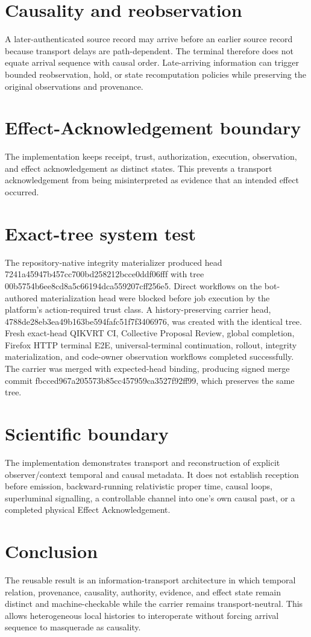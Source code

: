 \documentclass[11pt]{article}
\begin{document}
\section{Causality and reobservation}
A later-authenticated source record may arrive before an earlier source record because transport delays are path-dependent. The terminal therefore does not equate arrival sequence with causal order. Late-arriving information can trigger bounded reobservation, hold, or state recomputation policies while preserving the original observations and provenance.

\section{Effect-Acknowledgement boundary}
The implementation keeps receipt, trust, authorization, execution, observation, and effect acknowledgement as distinct states. This prevents a transport acknowledgement from being misinterpreted as evidence that an intended effect occurred.

\section{Exact-tree system test}
The repository-native integrity materializer produced head 7241a45947b457cc700bd258212bcce0ddf06fff with tree 00b5754b6ee8cd8a5c66194dca559207cff256e5. Direct workflows on the bot-authored materialization head were blocked before job execution by the platform's action-required trust class. A history-preserving carrier head, 4788de28eb3ea49b163be594fafc51f7f3406976, was created with the identical tree. Fresh exact-head QIKVRT CI, Collective Proposal Review, global completion, Firefox HTTP terminal E2E, universal-terminal continuation, rollout, integrity materialization, and code-owner observation workflows completed successfully. The carrier was merged with expected-head binding, producing signed merge commit fbcced967a205573b85cc457959ca3527f92ff99, which preserves the same tree.

\section{Scientific boundary}
The implementation demonstrates transport and reconstruction of explicit observer/context temporal and causal metadata. It does not establish reception before emission, backward-running relativistic proper time, causal loops, superluminal signalling, a controllable channel into one's own causal past, or a completed physical Effect Acknowledgement.

\section{Conclusion}
The reusable result is an information-transport architecture in which temporal relation, provenance, causality, authority, evidence, and effect state remain distinct and machine-checkable while the carrier remains transport-neutral. This allows heterogeneous local histories to interoperate without forcing arrival sequence to masquerade as causality.
\end{document}
